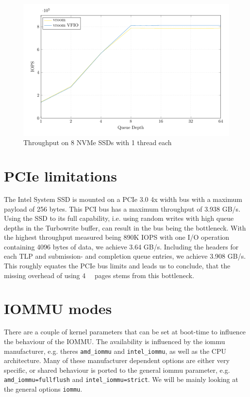 \begin{figure}[H]
  \centering
  \includegraphics[width=\textwidth]{figures/qdnt1_2MiB_8nvmes}
  \caption{Throughput on 8 NVMe SSDs with 1 thread each}
  \label{fig:8nvmes}
\end{figure}

\section{PCIe limitations}
The Intel System SSD is mounted on a PCIe 3.0 4x width bus with a maximum payload of 256 bytes. This PCI bus has a maximum throughput of 3.938 GB/s. Using the SSD to its full capability, i.e. using random writes with high queue depths in the Turbowrite buffer, can result in the bus being the bottleneck. With the highest throughput measured being 890K IOPS with one I/O operation containing 4096 bytes of data, we achieve 3.64 GB/s. Including the headers for each TLP and submission- and completion queue entries, we achieve 3.908 GB/s. This roughly equates the PCIe bus limits and leads us to conclude, that the missing overhead of using \qty{4}{\kibi\byte} pages stems from this bottleneck.

\section{IOMMU modes}
There are a couple of kernel parameters that can be set at boot-time to influence the behaviour of the IOMMU. The availability is influenced by the iommu manufacturer, e.g. theres \texttt{amd\_iommu} and \texttt{intel\_iommu}, as well as the CPU architecture. Many of these manufacturer dependent options are either very specific, or shared behaviour is ported to the general iommu parameter, e.g. \texttt{amd\_iommu=fullflush} and \texttt{intel\_iommu=strict}. We will be mainly looking at the general options \texttt{iommu}.

